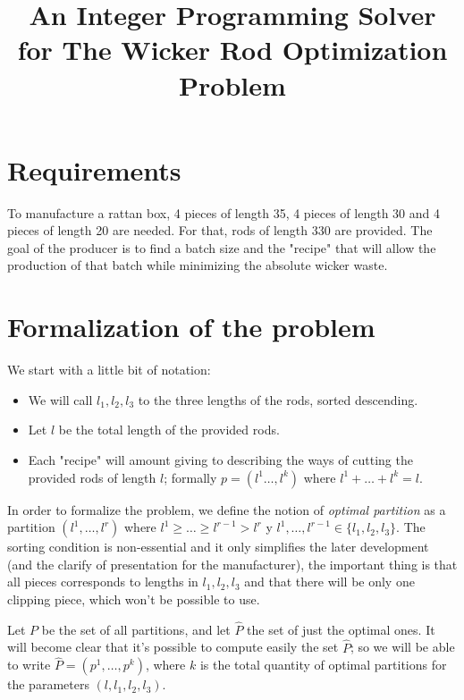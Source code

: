 \documentclass[12pt, letterpaper]{article}
\title{An Integer Programming Solver for The Wicker Rod Optimization Problem}
\begin{document}
\maketitle

\section{Requirements}
To manufacture a rattan box, 4 pieces of length 35, 4 pieces of length 30 and 4 pieces of length 20 are needed. For that, rods of length 330 are provided. The goal of the producer is to find a batch size and the "recipe" that will allow the production of that batch while minimizing the absolute wicker waste.



\section{Formalization of the problem}
We start with a little bit of notation:
\begin{itemize}
    \item We will call $l_1, l_2, l_3$ to the three lengths of the rods, sorted descending.
    \item Let $l$ be the total length of the provided rods.
    \item Each "recipe" will amount giving to describing the ways of cutting the provided rods of length $l$; formally $p = (l^1\dots,l^k)$ where $l^1 + \dots + l^k = l$.
\end{itemize}

In order to formalize the problem, we define the notion of \textit{optimal partition}
as a partition $(l^1,\dots,l^r)$ where $l^1 \geq \dots \geq l^{r-1} > l^r$ y $l^1,\dots,l^{r-1}\in\{l_1,l_2,l_3\}$. The sorting condition is non-essential and it only simplifies the later development (and the clarify of presentation for the manufacturer), the important thing is that all pieces corresponds to lengths in  ${l_1,l_2,l_3}$ and that there will be only one clipping piece, which won't be possible to use.

\vspace{10px}


Let $P$ be the set of all partitions, and let $\hat{P}$ the set of just the optimal ones. It will become clear that it's possible to compute easily the set $\hat{P}$; so we will be able to write $\hat{P} = (p^1,\dots,p^k)$, where $k$ is the total quantity of optimal partitions for the parameters $(l, l_1, l_2, l_3)$.
\end{document}
